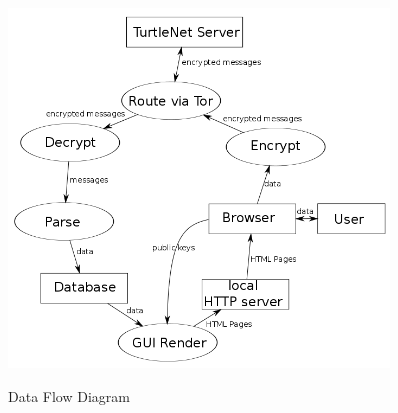 \begin{figure}[h]
\centering
\includegraphics[width=0.9\textwidth]{images/design/data_flow_diagram.png}
\label{data_flow}
\caption{Data Flow Diagram}
\end{figure}
